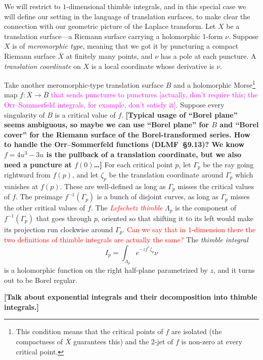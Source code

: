 \documentclass{article}
\theoremstyle{definition}
\newcommand{\maps}{\colon}
\begin{document}
\color{DarkGreen}
We will restrict to $1$-dimensional thimble integrals, and in this special case we will define our setting in the language of translation surfaces, to make clear the connection with our geometric picture of the Laplace transform.  
Let $X$ be a translation surface---a Riemann surface carrying a holomorphic 1-form $\nu$. Suppose $X$ is of {\em meromorphic type}, meaning that we got it by puncturing a compact Riemann surface $\overline{X}$ at finitely many points, and $\nu$ has a pole at each puncture. A {\em translation coordinate} on $X$ is a local coordinate whose derivative is $\nu$.

Take another meromorphic-type translation surface $B$ and a holomorphic Morse\footnote{This condition means that the critical points of $f$ are isolated (the compactness of $\overline{X}$ guarantees this) and the 2-jet of $f$ is non-zero at every critical point.} map $f \maps \overline{X} \to \overline{B}$ \textcolor{magenta}{that sends punctures to punctures [actually, don't require this; the Orr--Sommerfeld integrals, for example, don't satisfy it]}. Suppose every singularity of $B$ is a critical value of $f$. \textbf{[Typical usage of ``Borel plane'' seems ambiguous, so maybe we can use ``Borel plane'' for $B$ and ``Borel cover'' for the Riemann surface of the Borel-transformed series. How to handle the Orr–Sommerfeld functions (DLMF~\S 9.13)? We know $f = 4u^3 - 3u$ is the pullback of a translation coordinate, but we also need a puncture at $f(0)$\ldots]} For each critical point $p$, let $\Gamma_p$ be the ray going rightward from $f(p)$, and let $\zeta_p$ be the translation coordinate around $\Gamma_p$ which vanishes at $f(p)$. These are well-defined as long as $\Gamma_p$ misses the critical values of $f$. The preimage $f^{-1}(\Gamma_p)$ is a bunch of disjoint curves, as long as $\Gamma_p$ misses the other critical values of $f$. The \textcolor{red}{\em Lefschetz thimble} $\Lambda_p$ is the component of $f^{-1}(\Gamma_p)$ that goes through $p$, oriented so that shifting it to its left would make its projection run clockwise around $\Gamma_p$. \textcolor{red}{Can we say that in $1$-dimension there the two definitions of thimble integrals are actually the same?} The {\em thimble integral}
\[ I_p = \int_{\Lambda_p} e^{-z f^*\zeta_p} \nu \]
is a holomorphic function on the right half-plane parametrized by $z$, and it turns out to be Borel regular.

\textbf{[Talk about exponential integrals and their decomposition into thimble integrals.]}
\end{document}
